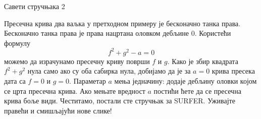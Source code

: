 \documentclass[sr]{./../../common/SurferDesc}%
\begin{document}
\footnotesize
%

 
 \begin{surferPage}
  \begin{surferTitle}Савети стручњака 2\end{surferTitle}
   \begin{surferText}

Пресечна крива два ваљка у претходном примеру је бесконачно танка права. Бесконачно танка права је права нацртана оловком дебљине 0. Користећи формулу
\[ f^2+g^2-a=0\]
можемо да израчунамо пресечну криву површи $f$ и $g$. Како је збир квадрата $f^2+g^2$ нула само ако су оба сабирка нула, добијамо да је за $a=0$ крива пресека дата са $f=0$ и $g=0$.
Параметар $a$ мења једначину: додаје дебљину оловки којом се црта пресечна крива. Ако мењате вредност $a$ постићи ћете да се пресечна крива боље види.
\newline \newline
Честитамо, постали сте стручњак за SURFER. Уживајте правећи и смишљајући нове слике!
 


     \end{surferText}
\end{surferPage}

\end{document}
